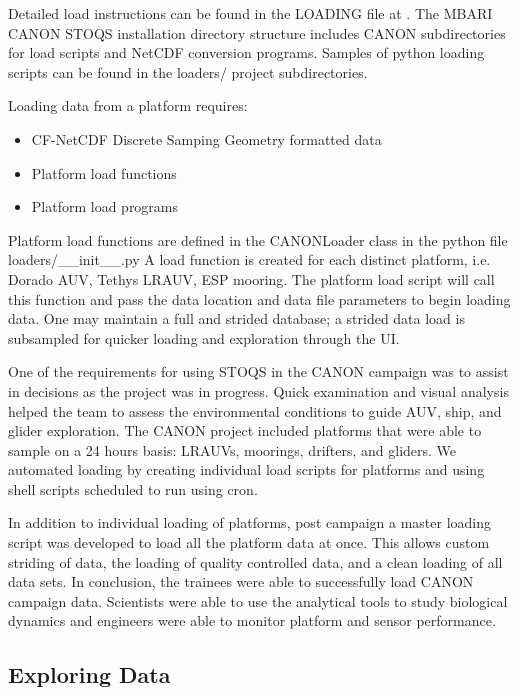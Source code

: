 \documentclass[conference]{IEEEtran}
\begin{document}
Detailed load instructions can be found in the LOADING file at \cite{STOQS}. The MBARI CANON STOQS installation directory structure includes CANON subdirectories for load scripts and NetCDF conversion programs. Samples of python loading scripts can be found in the loaders/ project subdirectories. 

Loading data from a platform requires:

\begin{itemize}
\item CF-NetCDF Discrete Samping Geometry formatted data
\item Platform load functions
\item Platform load programs
\end{itemize}

Platform load functions are defined in the CANONLoader class in the python file loaders/\_\_init\_\_.py   A load function is created for each distinct platform, i.e. Dorado AUV, Tethys LRAUV, ESP mooring. The platform load script will call this function and pass the data location and data file parameters to begin loading data.  One may maintain a full and strided database; a strided data load is subsampled for quicker loading and exploration through the UI.

One of the requirements for using STOQS in the CANON campaign was to assist in decisions as the project was in progress. Quick examination and visual analysis helped the team to assess the environmental conditions to guide AUV, ship, and glider exploration.  The CANON project included platforms that were able to sample on a 24 hours basis: LRAUVs, moorings, drifters, and gliders. We automated loading by creating individual load scripts for platforms and using shell scripts scheduled to run using cron. 

In addition to individual loading of platforms, post campaign a master loading script was developed to load all the platform data at once.  This allows custom striding of data, the loading of quality controlled data, and a clean loading of all data sets.  In conclusion, the trainees were able to successfully load CANON campaign data.  Scientists were able to use the analytical tools to study biological dynamics and engineers were able to monitor platform and sensor performance.  



\subsection{Exploring Data}
\end{document}
